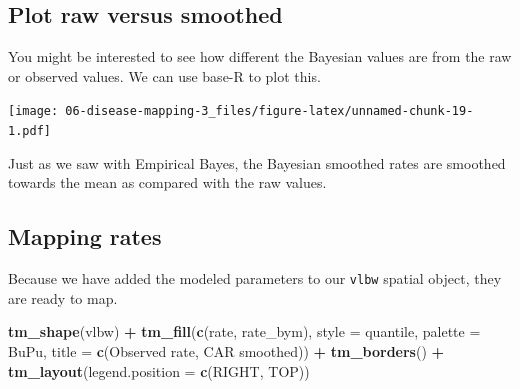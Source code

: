 \documentclass[
]{book}
\newenvironment{Shaded}{\begin{snugshade}}{\end{snugshade}}
\newcommand{\AttributeTok}[1]{\textcolor[rgb]{0.13,0.29,0.53}{#1}}
\newcommand{\FunctionTok}[1]{\textcolor[rgb]{0.13,0.29,0.53}{\textbf{#1}}}
\newcommand{\NormalTok}[1]{#1}
\newcommand{\SpecialCharTok}[1]{\textcolor[rgb]{0.81,0.36,0.00}{\textbf{#1}}}
\newcommand{\StringTok}[1]{\textcolor[rgb]{0.31,0.60,0.02}{#1}}
\begin{document}
\hypertarget{plot-raw-versus-smoothed}{%
\subsection{Plot raw versus smoothed}\label{plot-raw-versus-smoothed}}

You might be interested to see how different the Bayesian values are from the raw or observed values. We can use base-R to plot this.

\begin{Shaded}
\end{Shaded}

\texttt{[image: 06-disease-mapping-3\_files/figure-latex/unnamed-chunk-19-1.pdf]}

Just as we saw with Empirical Bayes, the Bayesian smoothed rates are smoothed towards the mean as compared with the raw values.

\hypertarget{mapping-rates}{%
\subsection{Mapping rates}\label{mapping-rates}}

Because we have added the modeled parameters to our \texttt{vlbw} spatial object, they are ready to map.

\begin{Shaded}
\begin{Highlighting}[]
\FunctionTok{tm\_shape}\NormalTok{(vlbw) }\SpecialCharTok{+} 
  \FunctionTok{tm\_fill}\NormalTok{(}\FunctionTok{c}\NormalTok{(}\StringTok{\textquotesingle{}rate\textquotesingle{}}\NormalTok{, }\StringTok{\textquotesingle{}rate\_bym\textquotesingle{}}\NormalTok{),}
          \AttributeTok{style =} \StringTok{\textquotesingle{}quantile\textquotesingle{}}\NormalTok{,}
          \AttributeTok{palette =} \StringTok{\textquotesingle{}BuPu\textquotesingle{}}\NormalTok{,}
          \AttributeTok{title =} \FunctionTok{c}\NormalTok{(}\StringTok{\textquotesingle{}Observed rate\textquotesingle{}}\NormalTok{, }\StringTok{\textquotesingle{}CAR smoothed\textquotesingle{}}\NormalTok{)) }\SpecialCharTok{+}
  \FunctionTok{tm\_borders}\NormalTok{() }\SpecialCharTok{+} 
  \FunctionTok{tm\_layout}\NormalTok{(}\AttributeTok{legend.position =} \FunctionTok{c}\NormalTok{(}\StringTok{\textquotesingle{}RIGHT\textquotesingle{}}\NormalTok{, }\StringTok{\textquotesingle{}TOP\textquotesingle{}}\NormalTok{))}
\end{Highlighting}
\end{Shaded}
\end{document}

